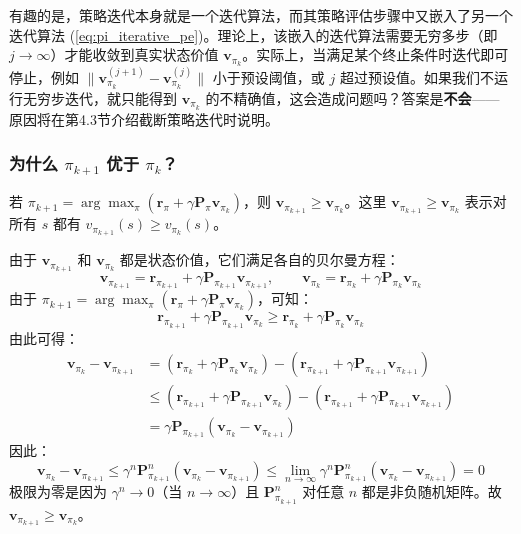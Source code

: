 \documentclass[UTF8]{article}
\begin{document}
有趣的是，策略迭代本身就是一个迭代算法，而其策略评估步骤中又嵌入了另一个迭代算法 (\ref{eq:pi_iterative_pe})。理论上，该嵌入的迭代算法需要无穷多步（即 $j \to \infty$）才能收敛到真实状态价值 $\boldsymbol{v}_{\pi_k}$。实际上，当满足某个终止条件时迭代即可停止，例如 $\|\boldsymbol{v}_{\pi_k}^{(j+1)} - \boldsymbol{v}_{\pi_k}^{(j)}\|$ 小于预设阈值，或 $j$ 超过预设值。如果我们不运行无穷步迭代，就只能得到 $\boldsymbol{v}_{\pi_k}$ 的不精确值，这会造成问题吗？答案是\textbf{不会}——原因将在第4.3节介绍截断策略迭代时说明。

\subsubsection*{为什么 $\pi_{k+1}$ 优于 $\pi_k$？}

\begin{theorembox}[4.1 策略改进]
    若 $\pi_{k+1} = \arg\max_\pi (\boldsymbol{r}_\pi + \gamma \boldsymbol{P}_\pi \boldsymbol{v}_{\pi_k})$，则 $\boldsymbol{v}_{\pi_{k+1}} \geq \boldsymbol{v}_{\pi_k}$。这里 $\boldsymbol{v}_{\pi_{k+1}} \geq \boldsymbol{v}_{\pi_k}$ 表示对所有 $s$ 都有 $v_{\pi_{k+1}}(s) \geq v_{\pi_k}(s)$。
\end{theorembox}

\begin{proofbox}
    由于 $\boldsymbol{v}_{\pi_{k+1}}$ 和 $\boldsymbol{v}_{\pi_k}$ 都是状态价值，它们满足各自的贝尔曼方程：
    \[
    \boldsymbol{v}_{\pi_{k+1}} = \boldsymbol{r}_{\pi_{k+1}} + \gamma \boldsymbol{P}_{\pi_{k+1}} \boldsymbol{v}_{\pi_{k+1}}, \qquad
    \boldsymbol{v}_{\pi_k} = \boldsymbol{r}_{\pi_k} + \gamma \boldsymbol{P}_{\pi_k} \boldsymbol{v}_{\pi_k}
    \]
    由于 $\pi_{k+1} = \arg\max_\pi (\boldsymbol{r}_\pi + \gamma \boldsymbol{P}_\pi \boldsymbol{v}_{\pi_k})$，可知：
    \[
    \boldsymbol{r}_{\pi_{k+1}} + \gamma \boldsymbol{P}_{\pi_{k+1}} \boldsymbol{v}_{\pi_k} \geq \boldsymbol{r}_{\pi_k} + \gamma \boldsymbol{P}_{\pi_k} \boldsymbol{v}_{\pi_k}
    \]
    由此可得：
    \[
    \begin{aligned}
    \boldsymbol{v}_{\pi_k} - \boldsymbol{v}_{\pi_{k+1}}
    &= (\boldsymbol{r}_{\pi_k} + \gamma \boldsymbol{P}_{\pi_k} \boldsymbol{v}_{\pi_k}) - (\boldsymbol{r}_{\pi_{k+1}} + \gamma \boldsymbol{P}_{\pi_{k+1}} \boldsymbol{v}_{\pi_{k+1}}) \\
    &\leq (\boldsymbol{r}_{\pi_{k+1}} + \gamma \boldsymbol{P}_{\pi_{k+1}} \boldsymbol{v}_{\pi_k}) - (\boldsymbol{r}_{\pi_{k+1}} + \gamma \boldsymbol{P}_{\pi_{k+1}} \boldsymbol{v}_{\pi_{k+1}}) \\
    &= \gamma \boldsymbol{P}_{\pi_{k+1}} (\boldsymbol{v}_{\pi_k} - \boldsymbol{v}_{\pi_{k+1}})
    \end{aligned}
    \]
    因此：
    \[
    \boldsymbol{v}_{\pi_k} - \boldsymbol{v}_{\pi_{k+1}} \leq \gamma^n \boldsymbol{P}_{\pi_{k+1}}^n (\boldsymbol{v}_{\pi_k} - \boldsymbol{v}_{\pi_{k+1}}) \leq \lim_{n \to \infty} \gamma^n \boldsymbol{P}_{\pi_{k+1}}^n (\boldsymbol{v}_{\pi_k} - \boldsymbol{v}_{\pi_{k+1}}) = 0
    \]
    极限为零是因为 $\gamma^n \to 0$（当 $n \to \infty$）且 $\boldsymbol{P}_{\pi_{k+1}}^n$ 对任意 $n$ 都是非负随机矩阵。故 $\boldsymbol{v}_{\pi_{k+1}} \geq \boldsymbol{v}_{\pi_k}$。
\end{proofbox}
\end{document}
